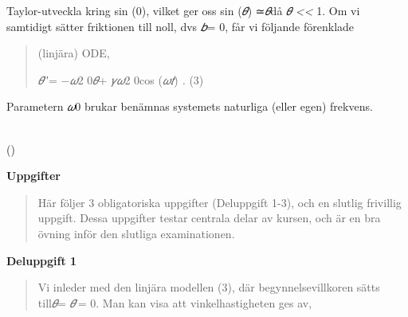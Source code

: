 \documentclass[
]{article}
\begin{document}
\begin{longtable}[]
{\begin{minipage}[t]{\linewidth}
Taylor-utveckla kring sin (0), vilket ger oss sin (\emph{𝜃}) ≃\emph{𝜃}då
\textbar{}\emph{𝜃}\textbar{} \emph{\textless\textless{}} 1. Om vi
samtidigt sätter friktionen till noll, dvs \emph{𝑏}= 0, får vi följande
förenklade

\begin{quote}
(linjära) ODE,

\emph{𝜃}′′= −\emph{𝜔}2 0\emph{𝜃}+ \emph{𝛾𝜔}2 0cos (\emph{𝜔𝑡}) \emph{.}
(3)
\end{quote}

Parametern \emph{𝜔}0 brukar benämnas systemets naturliga (eller egen)
frekvens.
\end{minipage}} \\
\bottomrule()
\end{longtable}

\textbf{Uppgifter}

\begin{quote}
Här följer 3 obligatoriska uppgifter (Deluppgift 1-3), och en slutlig
frivillig uppgift. Dessa uppgifter testar centrala delar av kursen, och
är en bra övning inför den slutliga examinationen.
\end{quote}

\textbf{Deluppgift 1}

\begin{quote}
Vi inleder med den linjära modellen (3), där begynnelsevillkoren sätts
till\emph{𝜃}= \emph{𝜃}′= 0. Man kan visa att vinkelhastigheten ges av,
\end{quote}
\end{document}
